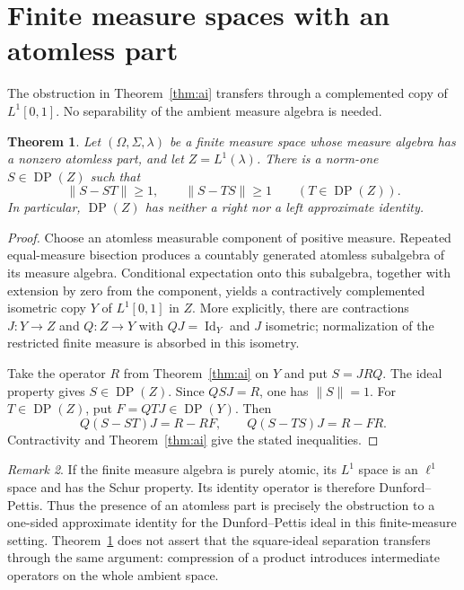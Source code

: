 \documentclass[11pt,reqno]{amsart}
\newtheorem{theorem}{Theorem}[section]
\theoremstyle{definition}
\theoremstyle{remark}
\newtheorem{remark}[theorem]{Remark}
\newcommand{\DP}{\operatorname{DP}}
\newcommand{\Id}{\operatorname{Id}}
\begin{document}
\section{Finite measure spaces with an atomless part}\label{sec:transfer}

The obstruction in Theorem~\ref{thm:ai} transfers through a complemented copy of $L^1[0,1]$. No separability of the ambient measure algebra is needed.

\begin{theorem}\label{thm:finite}
Let $(\Omega,\Sigma,\lambda)$ be a finite measure space whose measure algebra has a nonzero atomless part, and let $Z=L^1(\lambda)$. There is a norm-one $S\in\DP(Z)$ such that
\[
 \|S-ST\|\geq1,\qquad \|S-TS\|\geq1
 \qquad(T\in\DP(Z)).
\]
In particular, $\DP(Z)$ has neither a right nor a left approximate identity.
\end{theorem}
\begin{proof}
Choose an atomless measurable component of positive measure. Repeated equal-measure bisection produces a countably generated atomless subalgebra of its measure algebra. Conditional expectation onto this subalgebra, together with extension by zero from the component, yields a contractively complemented isometric copy $Y$ of $L^1[0,1]$ in $Z$. More explicitly, there are contractions $J:Y\to Z$ and $Q:Z\to Y$ with $QJ=\Id_Y$ and $J$ isometric; normalization of the restricted finite measure is absorbed in this isometry.

Take the operator $R$ from Theorem~\ref{thm:ai} on $Y$ and put $S=JRQ$. The ideal property gives $S\in\DP(Z)$. Since $QSJ=R$, one has $\|S\|=1$. For $T\in\DP(Z)$, put $F=QTJ\in\DP(Y)$. Then
\[
 Q(S-ST)J=R-RF,\qquad Q(S-TS)J=R-FR.
\]
Contractivity and Theorem~\ref{thm:ai} give the stated inequalities.
\end{proof}

\begin{remark}
If the finite measure algebra is purely atomic, its $L^1$ space is an $\ell^1$ space and has the Schur property. Its identity operator is therefore Dunford--Pettis. Thus the presence of an atomless part is precisely the obstruction to a one-sided approximate identity for the Dunford--Pettis ideal in this finite-measure setting. Theorem~\ref{thm:finite} does not assert that the square-ideal separation transfers through the same argument: compression of a product introduces intermediate operators on the whole ambient space.
\end{remark}
\end{document}
